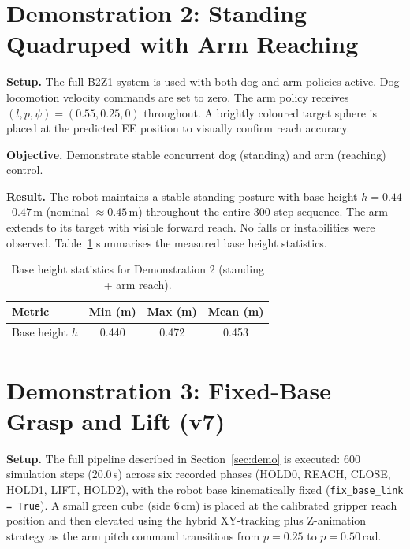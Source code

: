 \section{Demonstration 2: Standing Quadruped with Arm Reaching}
\label{sec:demo2}

\textbf{Setup.}  The full B2Z1 system is used with both dog and arm policies
active.  Dog locomotion velocity commands are set to zero.  The arm policy
receives $(l, p, \psi) = (0.55, 0.25, 0)$ throughout.
A brightly coloured target sphere is placed at the predicted EE position to
visually confirm reach accuracy.

\textbf{Objective.}  Demonstrate stable concurrent dog (standing) and arm
(reaching) control.

\textbf{Result.}  The robot maintains a stable standing posture with base
height $h = 0.44$--$0.47$\,m (nominal $\approx 0.45$\,m) throughout the
entire 300-step sequence.  The arm extends to its target with visible
forward reach.  No falls or instabilities were observed.
Table~\ref{tab:stability_demo2} summarises the measured base height
statistics.

\begin{table}[htbp]
  \centering
  \caption{Base height statistics for Demonstration 2 (standing + arm reach).}
  \label{tab:stability_demo2}
  \renewcommand{\arraystretch}{1.1}
  \begin{tabular}{lccc}
    \toprule
    \textbf{Metric} & \textbf{Min (m)} & \textbf{Max (m)} & \textbf{Mean (m)} \\
    \midrule
    Base height $h$ & 0.440 & 0.472 & 0.453 \\
    \bottomrule
  \end{tabular}
\end{table}

\section{Demonstration 3: Fixed-Base Grasp and Lift (v7)}
\label{sec:demo3}

\textbf{Setup.}  The full pipeline described in
Section~\ref{sec:demo} is executed: 600 simulation steps (20.0\,s) across
six recorded phases (HOLD0, REACH, CLOSE, HOLD1, LIFT, HOLD2), with the
robot base kinematically fixed (\texttt{fix\_base\_link = True}).
A small green cube (side 6\,cm) is placed at the calibrated gripper
reach position and then elevated using the hybrid XY-tracking plus
Z-animation strategy as the arm pitch command transitions from
$p=0.25$ to $p=0.50$\,rad.

